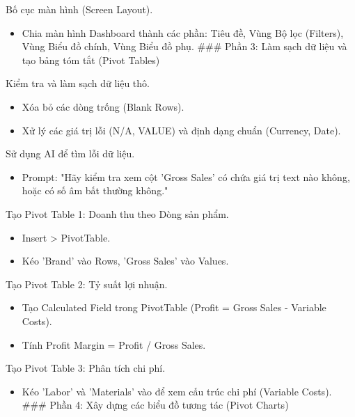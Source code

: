 \documentclass[aspectratio=169]{beamer}
\begin{document}
\begin{frame}{Bố cục màn hình (Screen Layout).}
    \begin{itemize}
        \item Chia màn hình Dashboard thành các phần: Tiêu đề, Vùng Bộ lọc (Filters), Vùng Biểu đồ chính, Vùng Biểu đồ phụ.
        ### Phần 3: Làm sạch dữ liệu và tạo bảng tóm tắt (Pivot Tables)
    \end{itemize}
\end{frame}


\begin{frame}{Kiểm tra và làm sạch dữ liệu thô.}
    \begin{itemize}
        \item Xóa bỏ các dòng trống (Blank Rows).
        \item Xử lý các giá trị lỗi (N/A, VALUE) và định dạng chuẩn (Currency, Date).
    \end{itemize}
\end{frame}


\begin{frame}{Sử dụng AI để tìm lỗi dữ liệu.}
    \begin{itemize}
        \item Prompt: "Hãy kiểm tra xem cột 'Gross Sales' có chứa giá trị text nào không, hoặc có số âm bất thường không."
    \end{itemize}
\end{frame}


\begin{frame}{Tạo Pivot Table 1: Doanh thu theo Dòng sản phẩm.}
    \begin{itemize}
        \item Insert > PivotTable.
        \item Kéo 'Brand' vào Rows, 'Gross Sales' vào Values.
    \end{itemize}
\end{frame}


\begin{frame}{Tạo Pivot Table 2: Tỷ suất lợi nhuận.}
    \begin{itemize}
        \item Tạo Calculated Field trong PivotTable (Profit = Gross Sales - Variable Costs).
        \item Tính Profit Margin = Profit / Gross Sales.
    \end{itemize}
\end{frame}


\begin{frame}{Tạo Pivot Table 3: Phân tích chi phí.}
    \begin{itemize}
        \item Kéo 'Labor' và 'Materials' vào để xem cấu trúc chi phí (Variable Costs).
        ### Phần 4: Xây dựng các biểu đồ tương tác (Pivot Charts)
    \end{itemize}
\end{frame}
\end{document}
